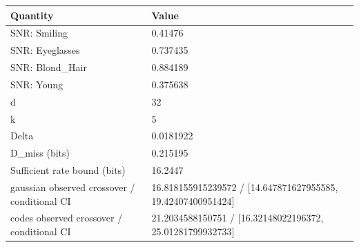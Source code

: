 \begin{tabular}{ll}
\toprule
Quantity & Value \\
\midrule
SNR: Smiling & 0.41476 \\
SNR: Eyeglasses & 0.737435 \\
SNR: Blond\_Hair & 0.884189 \\
SNR: Young & 0.375638 \\
d & 32 \\
k & 5 \\
Delta & 0.0181922 \\
D\_miss (bits) & 0.215195 \\
Sufficient rate bound (bits) & 16.2447 \\
gaussian observed crossover / conditional CI & 16.818155915239572 / [14.647871627955585, 19.42407400951424] \\
codes observed crossover / conditional CI & 21.2034588150751 / [16.32148022196372, 25.01281799932733] \\
\bottomrule
\end{tabular}
